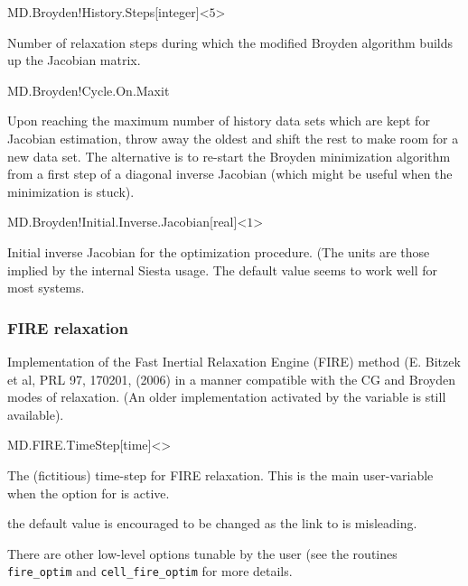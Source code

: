 \begin{fdfentry}{MD.Broyden!History.Steps}[integer]<$5$>

  Number of relaxation steps during which the modified Broyden
  algorithm builds up the Jacobian matrix.

\end{fdfentry}

\begin{fdflogicalT}{MD.Broyden!Cycle.On.Maxit}

  Upon reaching the maximum number of history data sets which are kept
  for Jacobian estimation, throw away the oldest and shift the rest to
  make room for a new data set. The alternative is to re-start the
  Broyden minimization algorithm from a first step of a diagonal
  inverse Jacobian (which might be useful when the minimization is
  stuck).

\end{fdflogicalT}

\begin{fdfentry}{MD.Broyden!Initial.Inverse.Jacobian}[real]<$1$>

  Initial inverse Jacobian for the optimization procedure. (The units
  are those implied by the internal Siesta usage. The default value
  seems to work well for most systems.

\end{fdfentry}



\subsubsection{FIRE relaxation}

Implementation of the Fast Inertial Relaxation Engine (FIRE) method
(E. Bitzek et al, PRL 97, 170201, (2006) in a manner compatible with
the CG and Broyden modes of relaxation. (An older implementation
activated by the  variable is still available).

\begin{fdfentry}{MD.FIRE.TimeStep}[time]<>
  
  The (fictitious) time-step for FIRE relaxation.  This is the main
  user-variable when the option  for
   is active.

  \note the default value is encouraged to be changed as the link to
   is misleading.

  There are other low-level options tunable by the user (see the
  routines \texttt{fire\_optim} and \texttt{cell\_fire\_optim} for
  more details.

\end{fdfentry}


